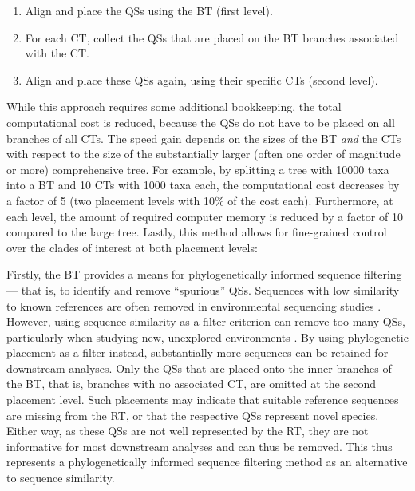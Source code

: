 \begin{enumerate}
    \item Align and place the \acp{QS} using the \ac{BT} (first level).
    \item For each \ac{CT}, collect the \acp{QS} that are placed on the \ac{BT} branches associated with the \ac{CT}.
    \item Align and place these \acp{QS} again, using their specific \acp{CT} (second level).
\end{enumerate}

While this approach requires some additional bookkeeping,
the total computational cost is reduced,
because the \acp{QS} do not have to be placed on all branches of all \acp{CT}.
The speed gain depends on the sizes of the \ac{BT} \emph{and} the \acp{CT}
with respect to the size of the substantially larger (often one order of magnitude or more) comprehensive tree.
For example, by splitting a tree with \num{10 000} taxa into a \ac{BT} and \num{10} \acp{CT} with 1000 taxa each,
the computational cost decreases by a factor of 5 (two placement levels with 10\% of the cost each).
Furthermore, at each level,
the amount of required computer memory is reduced by a factor of \num{10} compared to the large tree.
Lastly, this method allows for fine-grained control over the clades of interest at both placement levels:

Firstly, the \ac{BT} provides a means for phylogenetically informed sequence filtering---%
that is, to identify and remove ``spurious'' \acp{QS}.
Sequences with low similarity to known references are often removed in environmental sequencing studies \citep{Stoeck2010}.
However, using sequence similarity as a filter criterion can remove too many \acp{QS},
particularly when studying new, unexplored environments \citep{Mahe2017}.
By using phylogenetic placement as a filter instead, substantially more sequences can be retained for downstream analyses.
Only the \acp{QS} that are placed onto the inner branches of the \ac{BT},
that is, branches with no associated \ac{CT},
are omitted at the second placement level.
Such placements may indicate that suitable reference sequences are missing from the \ac{RT},
or that the respective \acp{QS} represent novel species.
Either way, as these \acp{QS} are not well represented by the \ac{RT},
they are not informative for most downstream analyses and can thus be removed.
This thus represents a phylogenetically informed sequence filtering method as an alternative to sequence similarity.

